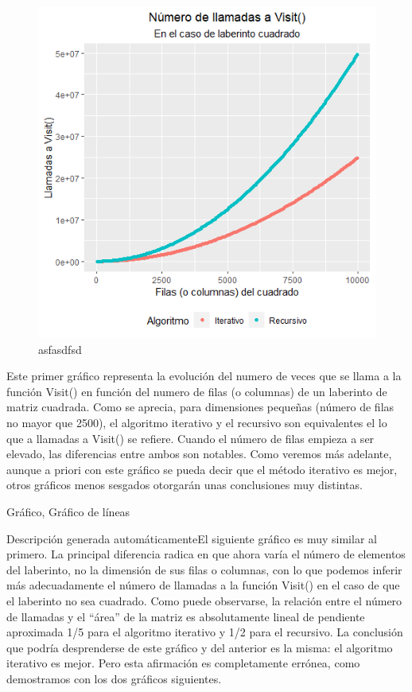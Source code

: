 \documentclass[12pt,a4paper]{article}
\begin{document}
\begin{figure}[H]
	\centering
	\includegraphics[scale=1.05]{fotos/Iteraciones_vs_filas.png}
	\caption{asfasdfsd}
	\label{dgrafic}
\end{figure}

Este primer gráfico representa la evolución del numero de veces que se llama a la función Visit() en función del numero de filas (o columnas) de un laberinto de matriz cuadrada. Como se aprecia, para dimensiones pequeñas (número de filas no mayor que 2500), el algoritmo iterativo y el recursivo son equivalentes el lo que a llamadas a Visit() se refiere. Cuando el número de filas empieza a ser elevado, las diferencias entre ambos son notables. Como veremos más adelante, aunque a priori con este gráfico se pueda decir que el método iterativo es mejor, otros gráficos menos sesgados otorgarán unas conclusiones muy distintas. 

 Gráfico, Gráfico de líneas

Descripción generada automáticamenteEl siguiente gráfico es muy similar al primero. La principal diferencia radica en que ahora varía el número de elementos del laberinto, no la dimensión de sus filas o columnas, con lo que podemos inferir más adecuadamente el número de llamadas a la función Visit() en el caso de que el laberinto no sea cuadrado. Como puede observarse, la relación entre el número de llamadas y el “área” de la matriz es absolutamente lineal de pendiente aproximada 1/5 para el algoritmo iterativo y 1/2 para el recursivo. La conclusión que podría desprenderse de este gráfico y del anterior es la misma: el algoritmo iterativo es mejor. Pero esta afirmación es completamente errónea, como demostramos con los dos gráficos siguientes. 
\end{document}
